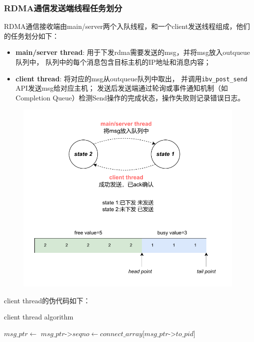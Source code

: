 {    \newpage
    \subsubsection{RDMA通信发送端线程任务划分}
    RDMA通信接收端由main/server两个入队线程，和一个client发送线程组成，他们的任务划分如下：

    \begin{itemize}[leftmargin=*, nosep]
        \item \textbf{main/server thread}:
              用于下发rdma需要发送的msg，并将msg放入outqueue队列中，
              队列中的每个消息包含目标主机的IP地址和消息内容；
        \item \textbf{client thread}:
              将对应的msg从outqueue队列中取出，
              并调用\texttt{ibv\_post\_send} API发送msg给对应主机；
              发送后发送端通过轮询或事件通知机制（如Completion Queue）检测Send操作的完成状态，操作失败则记录错误日志。
    \end{itemize}

    \begin{figure}[H]
        \centering
        \includegraphics[width=1.0\textwidth]{Img/send_state.drawio.pdf}
    \end{figure}

    client thread的伪代码如下：
    \begin{algorithm}
        \caption{client thread algorithm}
        \begin{algorithmic}[1] %
            \State {}
            \State $msg\_ptr \gets$ 
            \State $msg\_ptr$->$seqno \gets connect\_array[msg\_ptr$->$to\_pid]$


\end{algorithmic}
\end{algorithm}}
